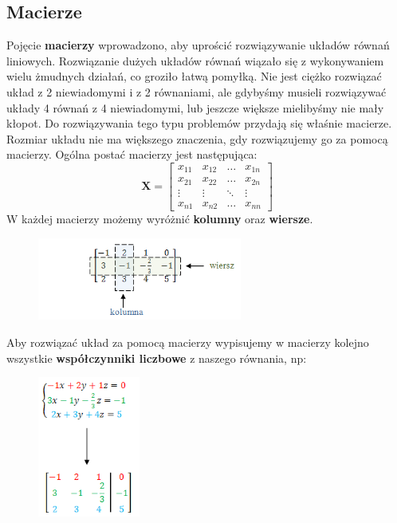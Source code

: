 \documentclass[12pt, a4paper]{article}
\begin{document}
\subsection{Macierze}
\label{sec:Macierze}
Pojęcie \textbf{macierzy} wprowadzono, aby uprościć rozwiązywanie układów równań liniowych. Rozwiązanie dużych układów równań wiązało się z wykonywaniem wielu żmudnych działań, co groziło łatwą pomyłką. Nie jest ciężko rozwiązać układ z 2 niewiadomymi i z 2 równaniami, ale gdybyśmy musieli rozwiązywać układy 4 równań z 4 niewiadomymi, lub jeszcze większe mielibyśmy nie mały kłopot. Do rozwiązywania tego typu problemów przydają się właśnie macierze. Rozmiar układu nie ma większego znaczenia, gdy rozwiązujemy go za pomocą macierzy.
\newline Ogólna postać macierzy jest następująca:
\begin{displaymath}
\mathbf{X} =
\left[ \begin{array}{cccc}
x_{11} & x_{12} & \ldots & x_{1n}\\
x_{21} & x_{22} & \ldots & x_{2n}\\
\vdots & \vdots & \ddots & \vdots\\
x_{n1} & x_{n2} & \ldots & x_{nn}
\end{array} \right]
\end{displaymath}
 W każdej macierzy możemy wyróżnić \textbf{kolumny} oraz \textbf{wiersze}.
\begin{figure}[htbp]
	\centering
		\includegraphics[width=0.60\textwidth]{macierz3.png}
	\label{fig:macierz3}
\end{figure}
\newline Aby rozwiązać układ za pomocą macierzy wypisujemy w macierzy kolejno wszystkie \textbf{współczynniki liczbowe} z naszego równania, np:
\begin{figure}[htbp]
	\centering
		\includegraphics[width=0.30\textwidth]{macierz2.png}
	\label{fig:macierz2}
\end{figure}
\end{document}

